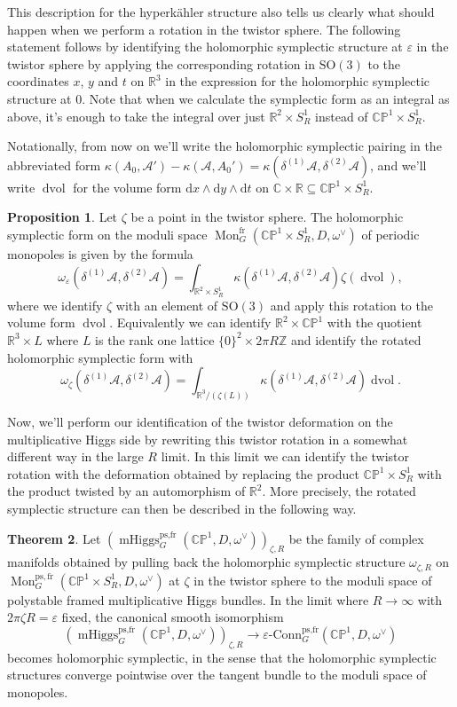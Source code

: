 \documentclass[11pt, oneside, reqno]{amsart}
\theoremstyle{definition} \newtheorem{definition}{Definition}[section]
\newtheorem{theorem}[definition]{Theorem}
\newtheorem{prop}[definition]{Proposition}
\theoremstyle{definition} \newtheorem{remark}[definition]{Remark}
\theoremstyle{definition} \newtheorem{remarks}[definition]{Remarks}
\theoremstyle{definition} \newtheorem{question}[definition]{Question}
\theoremstyle{definition} \newtheorem*{note}{Note}
\theoremstyle{definition} \newtheorem{example}[definition]{Example}
\theoremstyle{definition} \newtheorem{examples}[definition]{Examples}
\newcommand{\bb}[1]{\mathbb{#1}}
\newcommand{\mr}[1]{\mathrm{#1}}
\newcommand{\mc}[1]{\mathcal{#1}}
\newcommand{\CC}{\mathbb{C}}
\newcommand{\RR}{\mathbb{R}}
\newcommand{\ZZ}{\mathbb{Z}}
\newcommand{\eps}{\varepsilon}
\newcommand{\SO}{\mathrm{SO}}
\newcommand{\sub}{\subseteq}
\DeclareMathOperator{\dvol}{dvol}
\DeclareMathOperator{\mhiggs}{mHiggs}
\DeclareMathOperator{\mon}{Mon}
\newcommand{\epsconn}{\varepsilon\text{-Conn}}
\renewcommand{\d}{\mathrm{d}}
\newcommand{\fr}{\mathrm{fr}}
\begin{document}
This description for the hyperk\"ahler structure also tells us clearly what should happen when we perform a rotation in the twistor sphere.  The following statement follows by identifying the holomorphic symplectic structure at $\eps$ in the twistor sphere by applying the corresponding rotation in $\SO(3)$ to the coordinates $x$, $y$ and $t$ on $\RR^3$ in the expression for the holomorphic symplectic structure at $0$.  Note that when we calculate the symplectic form as an integral as above, it's enough to take the integral over just $\RR^2 \times S^1_R$ instead of $\bb{CP}^1 \times S^1_R$.

Notationally, from now on we'll write the holomorphic symplectic pairing in the abbreviated form $\kappa(A_0, \mc A') - \kappa(\mc A, A_0') = \kappa(\delta^{(1)} \mc A, \delta^{(2)} \mc A)$, and we'll write $\dvol$ for the volume form $\d x \wedge \d y \wedge \d t$ on $\CC \times \RR \sub \bb{CP}^1 \times S^1_R$.

\begin{prop}
Let $\zeta$ be a point in the twistor sphere.  The holomorphic symplectic form on the moduli space $\mon_G^{\fr}(\bb{CP}^1 \times S^1_R, D, \omega^\vee)$ of periodic monopoles is given by the formula 
\[\omega_\eps(\delta^{(1)}\mc A, \delta^{(2)}\mc A) = \int_{\RR^2 \times S^1_R} \kappa(\delta^{(1)} \mc A, \delta^{(2)} \mc A) \zeta(\dvol),\]
where we identify $\zeta$ with an element of $\SO(3)$ and apply this rotation to the volume form $\dvol$.  Equivalently we can identify $\RR^2 \times \bb{CP}^1$ with the quotient $\RR^3 \times L$ where $L$ is the rank one lattice $\{0\}^2 \times 2\pi R\ZZ$ and identify the rotated holomorphic symplectic form with 
\[\omega_\zeta(\delta^{(1)}\mc A, \delta^{(2)}\mc A) = \int_{\RR^3/(\zeta(L))} \kappa(\delta^{(1)} \mc A, \delta^{(2)} \mc A) \dvol.\]
\end{prop}

Now, we'll perform our identification of the twistor deformation on the multiplicative Higgs side by rewriting this twistor rotation in a somewhat different way in the large $R$ limit.  In this limit we can identify the twistor rotation with the deformation obtained by replacing the product $\bb{CP}^1 \times S^1_R$ with the product twisted by an automorphism of $\RR^2$.  More precisely, the rotated symplectic structure can then be described in the following way.

\begin{theorem} \label{HK_rotation_thm}
Let $\left(\mhiggs^{\text{ps,fr}}_G(\bb{CP}^1,D,\omega^\vee)\right)_{\zeta,R}$ be the family of complex manifolds obtained by pulling back the holomorphic symplectic structure $\omega_{\zeta,R}$ on $\mon_G^{\mr{ps},\fr}(\bb{CP}^1 \times S^1_R,D,\omega^\vee)$ at $\zeta$ in the twistor sphere to the moduli space of polystable framed multiplicative Higgs bundles.  In the limit where $R \to \infty$ with $2 \pi \zeta R = \eps$ fixed, the canonical smooth isomorphism
\[\left(\mhiggs^{\text{ps,fr}}_G(\bb{CP}^1,D,\omega^\vee)\right)_{\zeta,R} \to \epsconn^{\text{ps,fr}}_G(\bb{CP}^1,D,\omega^\vee)\]
becomes holomorphic symplectic, in the sense that the holomorphic symplectic structures converge pointwise over the tangent bundle to the moduli space of monopoles. 
\end{theorem}
\end{document}
